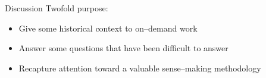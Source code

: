 \documentclass[presentation]{subfiles}
\begin{document}



\begin{frame}{Discussion}
Twofold purpose:
\begin{itemize}
  \item Give some historical context to \alert{on--demand work}
  \item Answer some questions that have been difficult to answer
  \item Recapture attention toward a valuable sense--making methodology
\end{itemize}
\end{frame}


\end{document}
